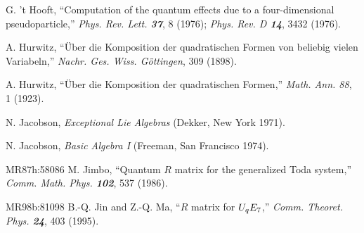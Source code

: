 
G. 't Hooft,
``Computation of the quantum effects due to a four-dimensional  pseudoparticle,''
{\em Phys. Rev. Lett.  \bf 37}, 8 (1976); {\em Phys.  Rev.    D \bf 14}, 3432 (1976).

 A. Hurwitz,
     ``\"Uber die Komposition der quadratischen Formen von
    beliebig vielen Variabeln,''
    {\em Nachr. Ges. Wiss. G\"ottingen}, 309 (1898). %

 A. Hurwitz,
    ``\"Uber die Komposition der quadratischen Formen,''
    {\em Math. Ann. 88}, 1 (1923). %





 N. Jacobson,
    {\em Exceptional Lie Algebras}
    (Dekker, New York 1971).

 N. Jacobson,
        {\em Basic Algebra I}
    (Freeman, San Francisco 1974).


        {MR87h:58086}
M. Jimbo,
``Quantum {$R$} matrix for the generalized Toda system,''
{\em Comm. Math. Phys.  \bf 102}, 537 (1986).  %

        {MR98b:81098} B.-Q. Jin and Z.-Q. Ma,
    ``$R$ matrix for $U\sb qE\sb 7$,''
    {\em Comm. Theoret. Phys.  \bf 24}, 403 (1995). %

%

